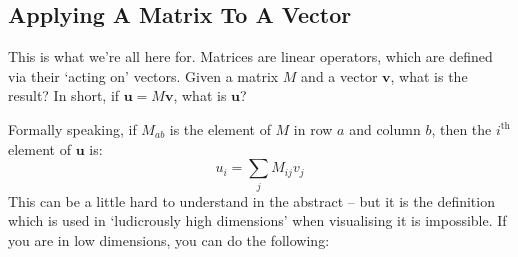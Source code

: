 \documentclass[a4paper,openany,11pt]{book}
\renewcommand\vec[1]{\boldsymbol{\mathbf{#1}}}
\begin{document}
				
					
				\subsection{Applying A Matrix To A Vector}

					This is what we're all here for. Matrices are linear operators, which are defined via their `acting on' vectors. Given a matrix $M$ and a vector $\vec{v}$, what is the result? In short, if $\vec{u} = M \vec{v}$, what is $\vec{u}$?

					Formally speaking, if $M_{ab}$ is the element of $M$ in row $a$ and column $b$, then the $i^\text{th}$ element of $\vec{u}$ is:
					\begin{equation}
						u_i = \sum_j M_{ij} v_j
					\end{equation}
					This can be a little hard to understand in the abstract -- but it is the definition which is used in `ludicrously high dimensions' when visualising it is impossible. If you are in low dimensions, you can do the following:
\end{document}
